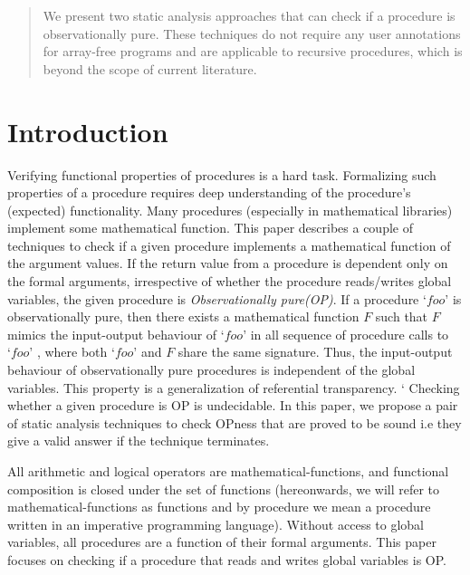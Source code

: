 \documentclass{llncs}
\newcommand{\foo}{\textit{`foo'}}
\newcommand{\F}{\mathit{F}}
\begin{document}
\begin{abstract}
We present two static analysis approaches that can check if a
procedure is observationally pure. These techniques do not require any
user annotations for array-free programs and are applicable to
recursive procedures, which is beyond the scope of current literature.

\end{abstract}

\section{Introduction}
Verifying functional properties of procedures is a hard task.
Formalizing such properties of a procedure requires deep understanding
of the procedure's (expected) functionality. Many procedures
(especially in mathematical libraries) implement some mathematical
function. This paper describes a couple of techniques to check if a
given procedure implements a mathematical function of the argument
values. If the return value from a procedure is dependent only on the
formal arguments, irrespective of whether the procedure reads/writes
global variables,
the given procedure is \textit{Observationally pure(OP)}.  If a
procedure $\foo$ is observationally pure, then there exists a
mathematical function $\F$ such that $\F$ mimics the input-output
behaviour of $\foo$ in all sequence of procedure calls to $\foo$ ,
where both $\foo$ and $\F$ share the same signature. Thus, the
input-output behaviour of observationally pure procedures is
independent of the global variables. This property is a generalization
of referential transparency.
`%
Checking whether a given procedure is OP is undecidable. In this
paper, we propose a pair of static analysis techniques to check OPness
that are proved to be sound i.e they give a valid answer if the
technique terminates.

All arithmetic and logical operators are mathematical-functions, and
functional composition is closed under the set of functions
(hereonwards, we will refer to mathematical-functions as functions and
by procedure we mean a procedure written in an imperative programming
language). Without access to global variables, all procedures are a
function of their formal arguments. This paper focuses on checking if
a procedure that reads and writes global variables is OP.
\end{document}
